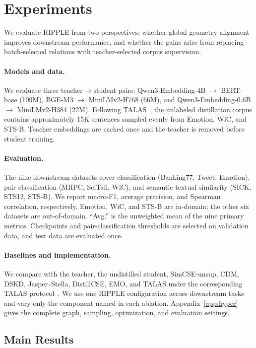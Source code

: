 \section{Experiments}
\label{sec:experiments}

We evaluate RIPPLE from two perspectives: whether global geometry alignment improves downstream performance, and whether the gains arise from replacing batch-selected relations with teacher-selected corpus supervision.

\paragraph{Models and data.}
We evaluate three teacher$\rightarrow$student pairs: Qwen3-Embedding-4B $\rightarrow$ BERT-base (109M), BGE-M3 $\rightarrow$ MiniLMv2-H768 (66M), and Qwen3-Embedding-0.6B $\rightarrow$ MiniLMv2-H384 (22M). Following TALAS~\citep{dao2026talas}, the unlabeled distillation corpus contains approximately 15K sentences sampled evenly from Emotion, WiC, and STS-B. Teacher embeddings are cached once and the teacher is removed before student training.

\paragraph{Evaluation.}
The nine downstream datasets cover classification (Banking77, Tweet, Emotion), pair classification (MRPC, SciTail, WiC), and semantic textual similarity (SICK, STS12, STS-B). We report macro-F1, average precision, and Spearman correlation, respectively. Emotion, WiC, and STS-B are in-domain; the other six datasets are out-of-domain. ``Avg.'' is the unweighted mean of the nine primary metrics. Checkpoints and pair-classification thresholds are selected on validation data, and test data are evaluated once.

\paragraph{Baselines and implementation.}
We compare with the teacher, the undistilled student, SimCSE-unsup, CDM, DSKD, Jasper--Stella, DistillCSE, EMO, and TALAS under the corresponding TALAS protocol~\citep{dao2026talas}. We use one RIPPLE configuration across downstream tasks and vary only the component named in each ablation. Appendix~\ref{app:hyper} gives the complete graph, sampling, optimization, and evaluation settings.

\subsection{Main Results}

